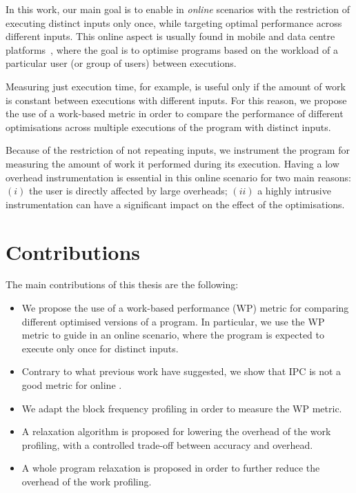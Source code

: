 In this work, our main goal is to enable {\itercomp} in \textit{online} scenarios with the restriction of executing distinct inputs only once, while targeting optimal performance across different inputs.
This online aspect is usually found in mobile and data centre platforms~\citep{chen12b,fang15,mpeis16}, where the goal is to optimise programs based on the workload of a particular user (or group of users) between executions.

Measuring just execution time, for example, is useful only if the amount of work is constant between executions with different inputs.
For this reason, we propose the use of a work-based metric in order to compare the performance of different optimisations across multiple executions of the program with distinct inputs.

Because of the restriction of not repeating inputs, we instrument the program for measuring the amount of work it performed during its execution.
Having a low overhead instrumentation is essential in this online scenario for two main reasons:
$(i)$ the user is directly affected by large overheads;
$(ii)$ a highly intrusive instrumentation can have a significant impact on the effect of the optimisations.

\section{Contributions}


The main contributions of this thesis are the following:
\begin{itemize}
\item We propose the use of a work-based performance (WP) metric for comparing different optimised versions of a program.
      In particular, we use the WP metric to guide {\itercomp} in an online scenario, where the program is expected to execute only once for distinct inputs.
\item Contrary to what previous work have suggested, we show that IPC is not a good metric for online {\itercomp}.
\item We adapt the block frequency profiling in order to measure the WP metric.
\item A relaxation algorithm is proposed for lowering the overhead of the work profiling, with a controlled trade-off between accuracy and overhead.
\item A whole program relaxation is proposed in order to further reduce the overhead of the work profiling.

\end{itemize}
